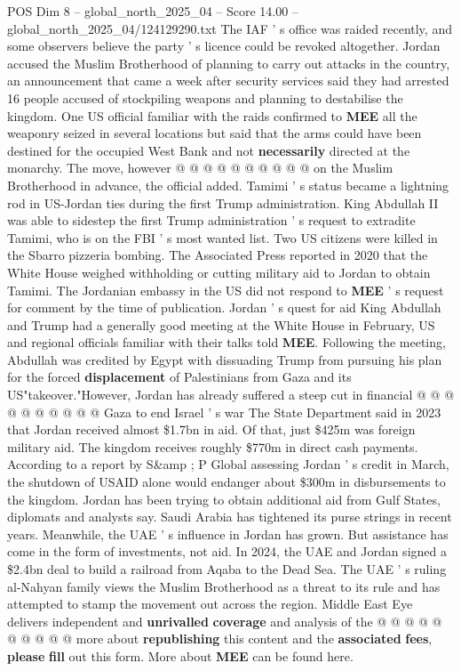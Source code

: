 \begin{textsample}{POS Dim 8 – global\_north\_2025\_04 – Score 14.00 – global\_north\_2025\_04/124129290.txt}
The IAF ' s office was raided recently, and some observers believe the party ' s licence could be revoked altogether.
Jordan accused the Muslim Brotherhood of planning to carry out attacks in the country, an announcement that came a week after security services said they had arrested 16 people accused of stockpiling weapons and planning to destabilise the kingdom.
One US official familiar with the raids confirmed to \textbf{MEE} all the weaponry seized in several locations but said that the arms could have been destined for the occupied West Bank and not \textbf{necessarily} directed at the monarchy.
The move, however @ @ @ @ @ @ @ @ @ @ on the Muslim Brotherhood in advance, the official added.
Tamimi ' s status became a lightning rod in US-Jordan ties during the first Trump administration.
King Abdullah II was able to sidestep the first Trump administration ' s request to extradite Tamimi, who is on the FBI ' s most wanted list.
Two US citizens were killed in the Sbarro pizzeria bombing.
The Associated Press reported in 2020 that the White House weighed withholding or cutting military aid to Jordan to obtain Tamimi.
The Jordanian embassy in the US did not respond to \textbf{MEE} ' s request for comment by the time of publication.
Jordan ' s quest for aid King Abdullah and Trump had a generally good meeting at the White House in February, US and regional officials familiar with their talks told \textbf{MEE}.
Following the meeting, Abdullah was credited by Egypt with dissuading Trump from pursuing his plan for the forced \textbf{displacement} of Palestinians from Gaza and its US"takeover."However, Jordan has already suffered a steep cut in financial @ @ @ @ @ @ @ @ @ @ Gaza to end Israel ' s war The State Department said in 2023 that Jordan received almost \$1.7bn in aid.
Of that, just \$425m was foreign military aid.
The kingdom receives roughly \$770m in direct cash payments.
According to a report by S\&amp ; P Global assessing Jordan ' s credit in March, the shutdown of USAID alone would endanger about \$300m in disbursements to the kingdom.
Jordan has been trying to obtain additional aid from Gulf States, diplomats and analysts say.
Saudi Arabia has tightened its purse strings in recent years.
Meanwhile, the UAE ' s influence in Jordan has grown.
But assistance has come in the form of investments, not aid.
In 2024, the UAE and Jordan signed a \$2.4bn deal to build a railroad from Aqaba to the Dead Sea.
The UAE ' s ruling al-Nahyan family views the Muslim Brotherhood as a threat to its rule and has attempted to stamp the movement out across the region.
Middle East Eye delivers independent and \textbf{unrivalled} \textbf{coverage} and analysis of the @ @ @ @ @ @ @ @ @ @ more about \textbf{republishing} this content and the \textbf{associated} \textbf{fees}, \textbf{please} \textbf{fill} out this form.
More about \textbf{MEE} can be found here.

\end{textsample}
